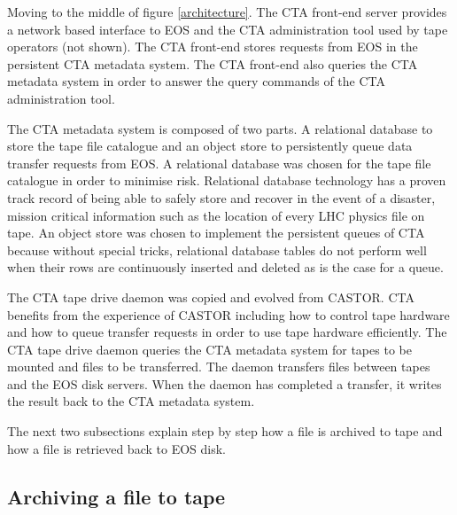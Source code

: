 \documentclass[a4paper]{jpconf}
\begin{document}
Moving to the middle of figure \ref{architecture}.  The CTA front-end server
provides a network based interface to EOS and the CTA administration tool used
by tape operators (not shown).  The CTA front-end stores requests from EOS in
the persistent CTA metadata system.  The CTA front-end also queries the CTA
metadata system in order to answer the query commands of the CTA administration
tool.

The CTA metadata system is composed of two parts.  A relational database to
store the tape file catalogue and an object store to persistently queue data
transfer requests from EOS.  A relational database was chosen for the tape file
catalogue in order to minimise risk.  Relational database technology has a
proven track record of being able to safely store and recover in the event of a
disaster, mission critical information such as the location of every LHC physics
file on tape.  An object store was chosen to implement the persistent queues of
CTA because without special tricks, relational database tables do not perform
well when their rows are continuously inserted and deleted as is the case for a
queue.

The CTA tape drive daemon was copied and evolved from CASTOR.  CTA benefits from
the experience of CASTOR including how to control tape hardware and how to queue
transfer requests in order to use tape hardware efficiently.  The CTA tape drive
daemon queries the CTA metadata system for tapes to be mounted and files to be
transferred.  The daemon transfers files between tapes and the EOS disk servers.
When the daemon has completed a transfer, it writes the result back to the CTA
metadata system.

The next two subsections explain step by step how a file is archived to tape and
how a file is retrieved back to EOS disk.

\pagebreak
\subsection{Archiving a file to tape}
\end{document}
